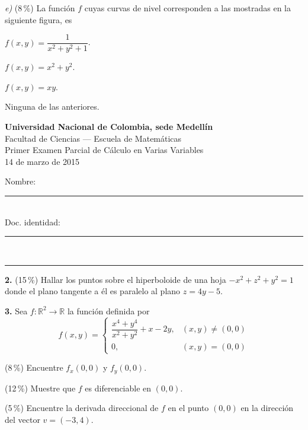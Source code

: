 \documentclass[11pt]{article}
\newcommand{\examheader}{%
  \noindent
  \begin{minipage}[t]{0.62\linewidth}
    {\bfseries\large Universidad Nacional de Colombia, sede Medell\'in}\\
    {\small Facultad de Ciencias --- Escuela de Matem\'aticas}\\
    {\small Primer Examen Parcial de C\'alculo en Varias Variables}\\
    {\small 14 de marzo de 2015}
  \end{minipage}%
  \hfill
  \begin{minipage}[t]{0.33\linewidth}
    \raggedleft\small
    Nombre: \rule{3cm}{0.4pt}\\[4pt]
    Doc. identidad: \rule{2.5cm}{0.4pt}
  \end{minipage}\\[4pt]
  \rule{\linewidth}{0.6pt}
}
\begin{document}
\medskip
\textit{e)} (8\,\%) La funci\'on $f$ cuyas curvas de nivel corresponden a las mostradas en la siguiente figura, es

\begin{center}
\end{center}

\begin{opciones}
  \item $f(x,y)=\dfrac{1}{x^2+y^2+1}$.
  \item $f(x,y)=x^2+y^2$.
  \item $f(x,y)=xy$.
  \item Ninguna de las anteriores.
\end{opciones}

\newpage
\examheader
\vspace{2pt}

\textbf{2.} (15\,\%) Hallar los puntos sobre el hiperboloide de una hoja $-x^2+z^2+y^2=1$ donde el plano tangente a \'el es paralelo al plano $z=4y-5$.

\bigskip
\bigskip

\textbf{3.} Sea $f:\mathbb{R}^2\to\mathbb{R}$ la funci\'on definida por
$$
f(x,y)=
\begin{cases}
\dfrac{x^4+y^4}{x^2+y^2}+x-2y, & (x,y)\neq (0,0)\\[4pt]
0, & (x,y)=(0,0)
\end{cases}
$$

\begin{opciones}
  \item[i.] (8\,\%) Encuentre $f_x(0,0)$ y $f_y(0,0)$.
  \item[ii.] (12\,\%) Muestre que $f$ es diferenciable en $(0,0)$.
  \item[iii.] (5\,\%) Encuentre la derivada direccional de $f$ en el punto $(0,0)$ en la direcci\'on del vector $v=(-3,4)$.
\end{opciones}
\end{document}
